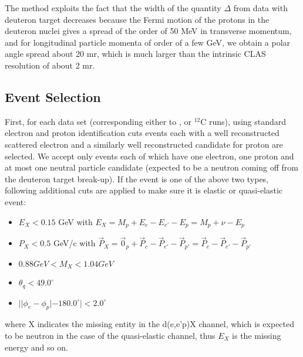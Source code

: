 The method exploits the fact that the width %
of the quantity $\Delta$ from data with deuteron target decreases because the Fermi motion of the protons in the deuteron nuclei gives a spread of the order of 50 MeV in transverse momentum, and for longitudinal particle momenta of order of a few GeV, we obtain a polar angle spread about 20 mr, which is much larger than the intrinsic CLAS resolution of about 2 mr. 


\subsection{Event Selection}
First, for each data set (corresponding either to ,  or $^{12}$C runs), using standard electron and proton identification cuts %
events each with a well reconstructed scattered electron and a similarly well reconstructed candidate for proton are selected. 
We accept only events each of which have one electron, one proton and at most one neutral particle candidate (expected to be a neutron coming off from the deuteron target break-up). %
If the event is one of the above two types, %
following additional cuts are applied to make sure it is elastic or quasi-elastic event:
    \begin{itemize}
       \item $E_X<0.15$ GeV \qquad with $E_X = M_p + E_e - E_{e'} - E_p = M_p + \nu - E_p $
       \item $P_X<0.5$ GeV/c \qquad with $\vec{P}_X = \vec{0}_p + \vec{P}_e - \vec{P}_{e'} - \vec{P}_{p'} = \vec{P}_e - \vec{P}_{e'} - \vec{P}_{p'} $
       \item $0.88 GeV<M_X<1.04 GeV$
       \item $\theta_q<49.0^{\circ}$
       \item $| |\phi_e - \phi_p| - 180.0^{\circ} |<2.0^{\circ}$
    \end{itemize}
where X indicates the missing entity in the d(e,e'p)X channel, which is expected to be neutron in the case of the quasi-elastic channel, thus $E_X$ is the missing energy and so on.

